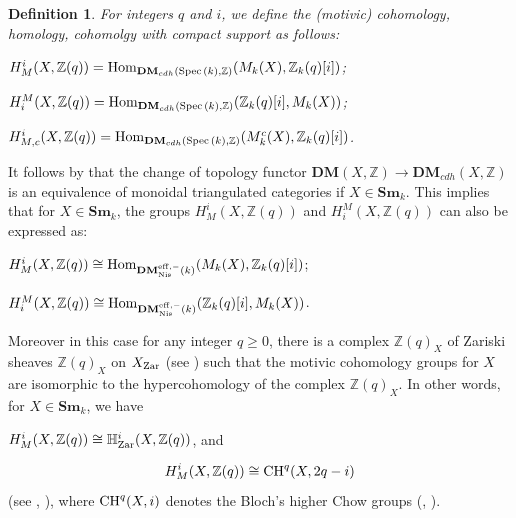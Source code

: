 \documentclass[12pt]{amsart}
\newtheorem{defn}[defn]{Definition}
\theoremstyle{remark}
\renewcommand{\1}{{\mathbb{S}}}
\newcommand{\CH}{{\rm CH}}
\newcommand{\Hom}{{\rm Hom}}
\newcommand{\Spec}{{\rm Spec \,}}
\newcommand{\Zar}{{\text{\rm Zar}}}
\newcommand{\<}{\langle}
\renewcommand{\>}{\rangle}
\newcommand{\Sm}{{\mathbf{Sm}}}
\newcommand{\eff}{{\operatorname{\rm eff}}}
\newcommand{\Nis}{{\operatorname{Nis}}}
\begin{document}
\begin{defn}
For integers $q$ and $i$, we define the (motivic) cohomology, homology, cohomolgy with compact support as follows:

\medskip

\begin{center}
	$H_{M}^{i}(X, \mathbb{Z}(q)) = \Hom_{\mathbf{DM}_{cdh}(\Spec(k), \mathbb{Z})} (M_{k}(X), \mathbb{Z}_{k}(q)[i] )$;
	
	\vspace{1mm}
	
	$H^{M}_{i}(X, \mathbb{Z}(q)) = \Hom_{\mathbf{DM}_{cdh}(\Spec(k), \mathbb{Z})} (\mathbb{Z}_{k}(q)[i], M_{k}(X))$;
	
	\vspace{1mm}
	
		$H_{M,c}^{i}(X, \mathbb{Z}(q)) = \Hom_{\mathbf{DM}_{cdh}(\Spec(k), \mathbb{Z})} (M_{k}^{c}(X), \mathbb{Z}_{k}(q)[i] )$.
	
\end{center}



\end{defn}

\vspace{1mm}


\vspace{1mm}

It follows by \cite[Corollary 5.9]{CD2} that the change of topology functor $\textbf{DM}(X, \mathbb{Z}) \rightarrow  \textbf{DM}_{cdh}(X, \mathbb{Z})$ is an equivalence of monoidal triangulated categories if $X \in \Sm_{k}$. This implies that for $X \in \Sm_{k}$, the groups $H_{M}^{i}(X, \mathbb{Z}(q)) $ and $H^{M}_{i}(X, \mathbb{Z}(q)) $ can also be expressed as:

\begin{center}
	$H_{M}^{i}(X, \mathbb{Z}(q)) \cong \Hom_{\textbf{DM}^{\eff,-}_{\Nis} (k)} (M_{k}(X), \mathbb{Z}_{k}(q)[i] )$;
	
	\vspace{1mm}
	
	$H^{M}_{i}(X, \mathbb{Z}(q)) \cong \Hom_{\textbf{DM}^{\eff,-}_{\Nis} (k)} (\mathbb{Z}_{k}(q)[i], M_{k}(X))$.
	
	\vspace{1mm}
	

\end{center}
Moreover  in this case for any integer $q \geq 0$, there is a complex $\mathbb{Z}(q)_{X}$ of Zariski sheaves $\mathbb{Z}(q)_{X}$ on $X_{\Zar}$ (see \cite[Definition 3.1]{MVW}) such that the motivic cohomology groups for $X$ are isomorphic to the hypercohomology of the complex $\mathbb{Z}(q)_{X}$. In other words, for $X \in \Sm_{k}$, we have 
\begin{center}
	$H_{M}^{i}(X, \mathbb{Z}(q)) \cong \mathbb{H}_{\Zar}^{i} (X, \mathbb{Z}(q))$, and
\end{center}
\begin{equation}\label{motivic-higher-chow-iso}
    H_{M}^{i}(X, \mathbb{Z}(q)) \cong \CH^{q}(X, 2q-i)
\end{equation} (see \cite[Theorem 19.1]{MVW}, \cite[Corollary 8.12]{CD2}), where $\CH^{q}(X,i)$ denotes the Bloch's higher Chow groups (\cite{Bl2}, \cite[Definition 17.1]{MVW}). 
\end{document}
